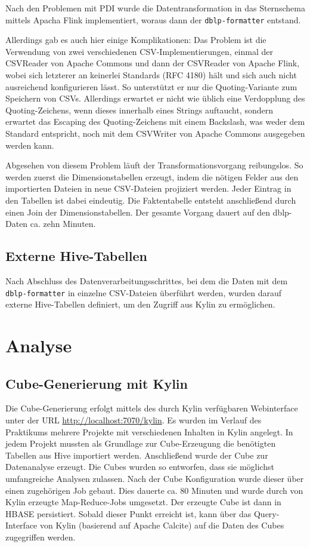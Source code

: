 \documentclass[a4paper,11pt,utf8]{scrartcl}
\begin{document}
Nach den Problemen mit PDI wurde die Datentransformation in das Sternschema mittels Apacha Flink implementiert, woraus dann der \texttt{dblp-formatter} entstand.

Allerdings gab es auch hier einige Komplikationen: Das Problem ist die Verwendung von zwei verschiedenen CSV-Implementierungen, einmal der CSVReader von Apache Commons und dann der CSVReader von Apache Flink, wobei sich letzterer an keinerlei Standards (RFC 4180) hält und sich auch nicht ausreichend konfigurieren lässt. So unterstützt er nur die Quoting-Variante zum Speichern von CSVs. Allerdings erwartet er nicht wie üblich eine Verdopplung des Quoting-Zeichens, wenn dieses innerhalb eines Strings auftaucht, sondern erwartet das Escaping des Quoting-Zeichens mit einem Backslash, was weder dem Standard entspricht, noch mit dem CSVWriter von Apache Commons ausgegeben werden kann.

Abgesehen von diesem Problem läuft der Transformationsvorgang reibungslos. So werden zuerst die Dimensionstabellen erzeugt, indem die nötigen Felder aus den importierten Dateien in neue CSV-Dateien projiziert werden. Jeder Eintrag in den Tabellen ist dabei eindeutig. Die Faktentabelle entsteht anschließend durch einen Join der Dimensionstabellen. Der gesamte Vorgang dauert auf den dblp-Daten ca. zehn Minuten.

\subsection{Externe Hive-Tabellen}

Nach Abschluss des Datenverarbeitungsschrittes, bei dem die Daten mit dem \texttt{dblp-formatter} in einzelne CSV-Dateien überführt werden, wurden darauf externe Hive-Tabellen definiert, um den Zugriff aus Kylin zu ermöglichen.

\section{Analyse}
\label{sec:Analyse}

\subsection{Cube-Generierung mit Kylin}

Die Cube-Generierung erfolgt mittels des durch Kylin verfügbaren Webinterface unter der URL \url{http://localhost:7070/kylin}. Es wurden im Verlauf des Praktikums mehrere Projekte mit verschiedenen Inhalten in Kylin angelegt. In jedem Projekt mussten als Grundlage zur Cube-Erzeugung die benötigten Tabellen aus Hive importiert werden. Anschließend wurde der Cube zur Datenanalyse erzeugt. Die Cubes wurden so entworfen, dass sie möglichst umfangreiche Analysen zulassen. Nach der Cube Konfiguration wurde dieser über einen zugehörigen Job gebaut. Dies dauerte ca. 80 Minuten und wurde durch von Kylin erzeugte Map-Reduce-Jobs umgesetzt. Der erzeugte Cube ist dann in HBASE persistiert. Sobald dieser Punkt erreicht ist, kann über das Query-Interface von Kylin (basierend auf Apache Calcite) auf die Daten des Cubes zugegriffen werden. 
\end{document}
